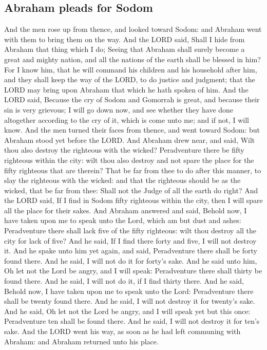 \begin{biblechapter}
\section*{Abraham pleads for Sodom}
\verse And the men rose up from thence, and looked toward Sodom: and Abraham went with them to bring them on the way.
\verse And the LORD said, Shall I hide from Abraham that thing which I do;
\verse Seeing that Abraham shall surely become a great and mighty nation, and all the nations of the earth shall be blessed in him?
\verse For I know him, that he will command his children and his household after him, and they shall keep the way of the LORD, to do justice and judgment; that the LORD may bring upon Abraham that which he hath spoken of him.
\verse And the LORD said, Because the cry of Sodom and Gomorrah is great, and because their sin is very grievous;
\verse I will go down now, and see whether they have done altogether according to the cry of it, which is come unto me; and if not, I will know.
\verse And the men turned their faces from thence, and went toward Sodom: but Abraham stood yet before the LORD.
\verse And Abraham drew near, and said, Wilt thou also destroy the righteous with the wicked?
\verse Peradventure there be fifty righteous within the city: wilt thou also destroy and not spare the place for the fifty righteous that are therein?
\verse That be far from thee to do after this manner, to slay the righteous with the wicked: and that the righteous should be as the wicked, that be far from thee: Shall not the Judge of all the earth do right?
\verse And the LORD said, If I find in Sodom fifty righteous within the city, then I will spare all the place for their sakes.
\verse And Abraham answered and said, Behold now, I have taken upon me to speak unto the Lord, which am but dust and ashes:
\verse Peradventure there shall lack five of the fifty righteous: wilt thou destroy all the city for lack of five? And he said, If I find there forty and five, I will not destroy it.
\verse And he spake unto him yet again, and said, Peradventure there shall be forty found there. And he said, I will not do it for forty's sake.
\verse And he said unto him, Oh let not the Lord be angry, and I will speak: Peradventure there shall thirty be found there. And he said, I will not do it, if I find thirty there.
\verse And he said, Behold now, I have taken upon me to speak unto the Lord: Peradventure there shall be twenty found there. And he said, I will not destroy it for twenty's sake.
\verse And he said, Oh let not the Lord be angry, and I will speak yet but this once: Peradventure ten shall be found there. And he said, I will not destroy it for ten's sake.
\verse And the LORD went his way, as soon as he had left communing with Abraham: and Abraham returned unto his place.
\end{biblechapter}

